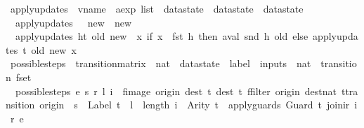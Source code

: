 \begin{isabellebody}
%
\endisatagproof
{\isafoldproof}%
%
\isadelimproof
\isanewline
%
\endisadelimproof
\isanewline
{}\isamarkupfalse%
\ apply{\isacharunderscore}updates\ {\isacharcolon}{\isacharcolon}\ {\isachardoublequoteopen}{\isacharparenleft}vname\ {\isasymtimes}\ aexp{\isacharparenright}\ list\ {\isasymRightarrow}\ datastate\ {\isasymRightarrow}\ datastate\ {\isasymRightarrow}\ datastate{\isachardoublequoteclose}\ \isanewline
\ \ {\isachardoublequoteopen}apply{\isacharunderscore}updates\ {\isacharbrackleft}{\isacharbrackright}\ {\isacharunderscore}\ new\ {\isacharequal}\ new{\isachardoublequoteclose}\ {\isacharbar}\isanewline
\ \ {\isachardoublequoteopen}apply{\isacharunderscore}updates\ {\isacharparenleft}h{\isacharhash}t{\isacharparenright}\ old\ new\ {\isacharequal}\ {\isacharparenleft}{\isasymlambda}x{\isachardot}\ if\ x\ {\isacharequal}\ {\isacharparenleft}fst\ h{\isacharparenright}\ then\ {\isacharparenleft}aval\ {\isacharparenleft}snd\ h{\isacharparenright}\ old{\isacharparenright}\ else\ {\isacharparenleft}apply{\isacharunderscore}updates\ t\ old\ new{\isacharparenright}\ x{\isacharparenright}{\isachardoublequoteclose}\isanewline
\isanewline
{}\isamarkupfalse%
\ possible{\isacharunderscore}steps\ {\isacharcolon}{\isacharcolon}\ {\isachardoublequoteopen}transition{\isacharunderscore}matrix\ {\isasymRightarrow}\ nat\ {\isasymRightarrow}\ datastate\ {\isasymRightarrow}\ label\ {\isasymRightarrow}\ inputs\ {\isasymRightarrow}\ {\isacharparenleft}nat\ {\isasymtimes}\ transition{\isacharparenright}\ fset{\isachardoublequoteclose}\ \isanewline
\ \ {\isachardoublequoteopen}possible{\isacharunderscore}steps\ e\ s\ r\ l\ i\ {\isacharequal}\ fimage\ {\isacharparenleft}{\isasymlambda}{\isacharparenleft}{\isacharparenleft}origin{\isacharcomma}\ dest{\isacharparenright}{\isacharcomma}\ t{\isacharparenright}{\isachardot}\ {\isacharparenleft}dest{\isacharcomma}\ t{\isacharparenright}{\isacharparenright}\ {\isacharparenleft}ffilter\ {\isacharparenleft}{\isasymlambda}{\isacharparenleft}{\isacharparenleft}origin{\isacharcomma}\ dest{\isacharcolon}{\isacharcolon}nat{\isacharparenright}{\isacharcomma}\ t{\isacharcolon}{\isacharcolon}transition{\isacharparenright}{\isachardot}\ origin\ {\isacharequal}\ s\ {\isasymand}\ {\isacharparenleft}Label\ t{\isacharparenright}\ {\isacharequal}\ l\ {\isasymand}\ {\isacharparenleft}length\ i{\isacharparenright}\ {\isacharequal}\ {\isacharparenleft}Arity\ t{\isacharparenright}\ {\isasymand}\ apply{\isacharunderscore}guards\ {\isacharparenleft}Guard\ t{\isacharparenright}\ {\isacharparenleft}join{\isacharunderscore}ir\ i\ r{\isacharparenright}{\isacharparenright}\ e{\isacharparenright}{\isachardoublequoteclose}\isanewline

\end{isabellebody}

